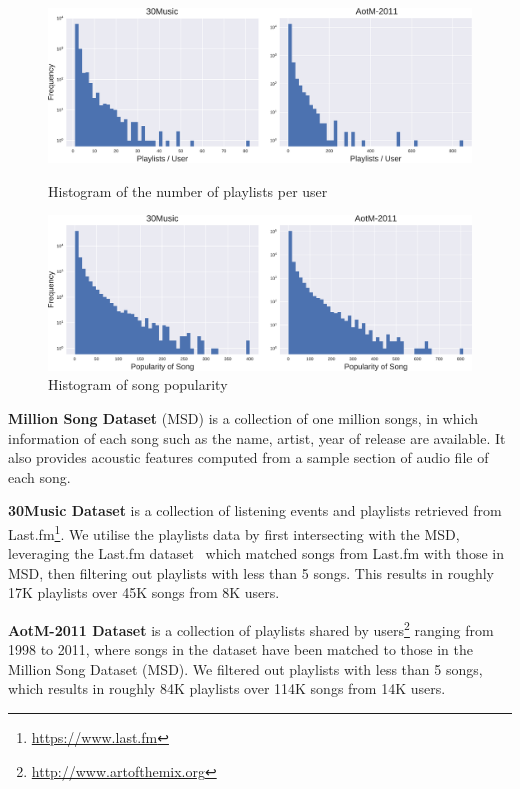 \begin{figure}[!t]
    \centering
    \begin{minipage}{.5\textwidth}
        \centering
        \includegraphics[width=.95\linewidth]{fig/hist_pluser.pdf}
        \caption{Histogram of the number of playlists per user}
        \label{fig:hist_pluser}
    \end{minipage}%
    \begin{minipage}{0.5\textwidth}
        \centering
        \includegraphics[width=.95\linewidth]{fig/hist_songpop.pdf}
        \caption{Histogram of song popularity}
        \label{fig:hist_songpop}
    \end{minipage}
\end{figure}

{\bf Million Song Dataset} (MSD) is a collection of one million songs, in which information of each song such as the name, 
artist, year of release are available.
It also provides acoustic features computed from a sample section of audio file of each song. %

{\bf 30Music Dataset} is a collection of listening events and playlists retrieved from Last.fm\footnote{\url{https://www.last.fm}}.
We utilise the playlists data by first intersecting with the MSD, leveraging the Last.fm dataset~\cite{lastfmdataset}
which matched songs from Last.fm with those in MSD, then filtering out playlists with less than 5 songs.
This results in roughly 17K playlists over 45K songs from 8K users.

{\bf AotM-2011 Dataset} is a collection of playlists shared by users\footnote{\url{http://www.artofthemix.org}} ranging from 1998 to 2011,
where songs in the dataset have been matched to those in the Million Song Dataset (MSD).
We filtered out playlists with less than 5 songs, which results in roughly 84K playlists over 114K songs from 14K users.

